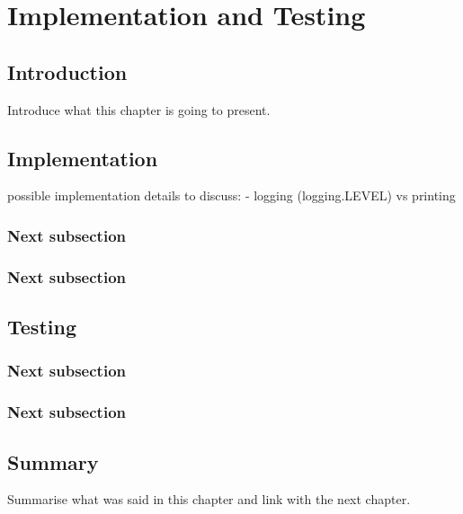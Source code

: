 \chapter{Implementation and Testing}

\section{Introduction}
Introduce what this chapter is going to present.
\section{Implementation}

possible implementation details to discuss:
- logging (logging.LEVEL) vs printing


\subsection{Next subsection}

\subsection{Next subsection}

\section{Testing}

\subsection{Next subsection}

\subsection{Next subsection}

\section{Summary}
Summarise what was said in this chapter and link with the next chapter.